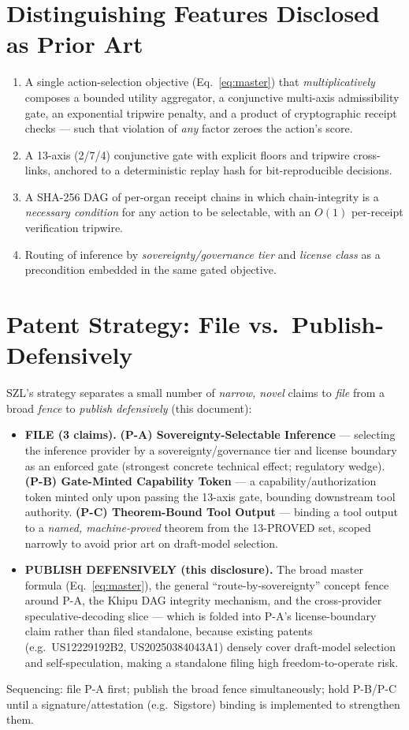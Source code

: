\documentclass[10pt,conference]{IEEEtran}
\begin{document}
\section{Distinguishing Features Disclosed as Prior Art}
\begin{enumerate}[leftmargin=1.4em]
\item A single action-selection objective (Eq.~\ref{eq:master}) that
\emph{multiplicatively} composes a bounded utility aggregator, a conjunctive multi-axis
admissibility gate, an exponential tripwire penalty, and a product of cryptographic
receipt checks --- such that violation of \emph{any} factor zeroes the action's score.
\item A 13-axis (2/7/4) conjunctive gate with explicit floors and tripwire cross-links,
anchored to a deterministic replay hash for bit-reproducible decisions.
\item A SHA-256 DAG of per-organ receipt chains in which chain-integrity is a
\emph{necessary condition} for any action to be selectable, with an $O(1)$ per-receipt
verification tripwire.
\item Routing of inference by \emph{sovereignty/governance tier} and \emph{license
class} as a precondition embedded in the same gated objective.
\end{enumerate}

\section{Patent Strategy: File vs.\ Publish-Defensively}\label{sec:patent}
SZL's strategy separates a small number of \emph{narrow, novel} claims to \emph{file}
from a broad \emph{fence} to \emph{publish defensively} (this document):
\begin{itemize}[leftmargin=1.2em]
\item \textbf{FILE (3 claims).}
\textbf{(P-A) Sovereignty-Selectable Inference} --- selecting the inference provider by a
sovereignty/governance tier and license boundary as an enforced gate (strongest concrete
technical effect; regulatory wedge). \textbf{(P-B) Gate-Minted Capability Token} --- a
capability/authorization token minted only upon passing the 13-axis gate, bounding
downstream tool authority. \textbf{(P-C) Theorem-Bound Tool Output} --- binding a tool
output to a \emph{named, machine-proved} theorem from the 13-PROVED set, scoped narrowly
to avoid prior art on draft-model selection.
\item \textbf{PUBLISH DEFENSIVELY (this disclosure).} The broad master formula
(Eq.~\ref{eq:master}), the general ``route-by-sovereignty'' concept fence around P-A,
the Khipu DAG integrity mechanism, and the cross-provider speculative-decoding slice ---
which is folded into P-A's license-boundary claim rather than filed standalone, because
existing patents (e.g.\ US12229192B2, US20250384043A1) densely cover draft-model
selection and self-speculation, making a standalone filing high freedom-to-operate risk.
\end{itemize}
Sequencing: file P-A first; publish the broad fence simultaneously; hold P-B/P-C until a
signature/attestation (e.g.\ Sigstore) binding is implemented to strengthen them.
\end{document}
